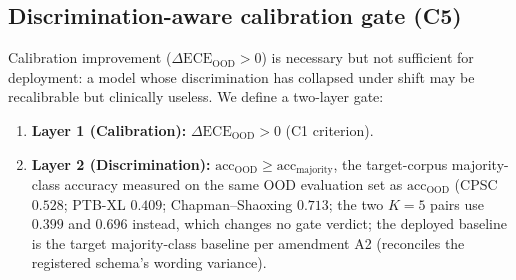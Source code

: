 \documentclass[final,5p,times,nonatbib]{elsarticle}
\begin{document}
\subsection{Discrimination-aware calibration gate (C5)}
\label{sec:gate}
Calibration improvement ($\Delta\text{ECE}_{\text{OOD}} > 0$) is
necessary but not sufficient for deployment: a model whose
discrimination has collapsed under shift may be recalibrable but
clinically useless. We define a two-layer gate:
\begin{enumerate}
    \item \textbf{Layer 1 (Calibration):} $\Delta\text{ECE}_{\text{OOD}} > 0$
    (C1 criterion).
    \item \textbf{Layer 2 (Discrimination):} $\text{acc}_{\text{OOD}} \geq
    \text{acc}_{\text{majority}}$, the target-corpus majority-class
    accuracy measured on the same OOD evaluation set as
    $\text{acc}_{\text{OOD}}$ (CPSC $0.528$; PTB-XL $0.409$;
    Chapman--Shaoxing $0.713$; the two $K{=}5$ pairs use $0.399$ and
    $0.696$ instead, which changes no gate verdict; the deployed
    baseline is the target majority-class baseline per amendment A2
    (reconciles the registered schema's wording variance).
\end{enumerate}
\end{document}
